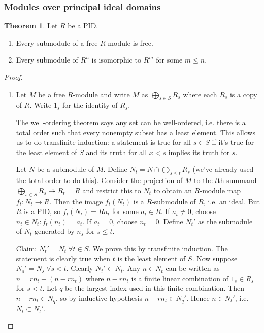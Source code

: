 \documentclass{article}
\theoremstyle{definition}
\newtheorem{thm}[defn]{Theorem}
\begin{document}
\subsubsection{Modules over principal ideal domains}
\begin{thm}
Let $R$ be a PID.
\begin{enumerate}
\item Every submodule of a free $R$-module is free.
\item Every submodule of $R^n$ is isomorphic to $R^m$ for some $m\leq n$.
\end{enumerate}
\end{thm}
\begin{proof}
\begin{enumerate}
\item Let $M$ be a free $R$-module and write $M$ as $\bigoplus_{s\in S}R_s$ where each $R_s$ is a copy of $R$. Write $1_s$ for the identity of $R_s$.

The well-ordering theorem says any set can be well-ordered, i.e. there is a total order such that every nonempty subset has a least element. This allows us to do transfinite induction: a statement is true for all $s\in S$ if it's true for the least element of $S$ and its truth for all $x<s$ implies its truth for $s$.

Let $N$ be a submodule of $M$. Define $N_t=N\cap\bigoplus_{s\leq t}R_s$ (we've already used the total order to do this). Consider the projection of $M$ to the $t$th summand $\bigoplus_{s\in S}R_s\twoheadrightarrow R_t=R$ and restrict this to $N_t$ to obtain an $R$-module map $f_t:N_t\rightarrow R$. Then the image $f_t(N_t)$ is a $R$-submodule of $R$, i.e. an ideal. But $R$ is a PID, so $f_t(N_t)=Ra_t$ for some $a_t\in R$. If $a_t\neq 0$, choose $n_t\in N_t:f_t(n_t)=a_t$. If $a_t=0$, choose $n_t=0$. Define $N_t'$ as the submodule of $N_t$ generated by $n_s$ for $s\leq t$.

Claim: $N_t'=N_t \ \forall t\in S$. We prove this by transfinite induction. The statement is clearly true when $t$ is the least element of $S$. Now suppose $N_s'=N_s \ \forall s<t$. Clearly $N_t'\subset N_t$. Any $n\in N_t$ can be written as $n=rn_t+(n-rn_t)$ where $n-rn_t$ is a finite linear combination of $1_s\in R_s$ for $s<t$. Let $q$ be the largest index used in this finite combination. Then $n-rn_t\in N_q$, so by inductive hypothesis $n-rn_t\in N_q'$. Hence $n\in N_t'$, i.e. $N_t\subset N_t'$.


\end{enumerate}
\end{proof}
\end{document}
